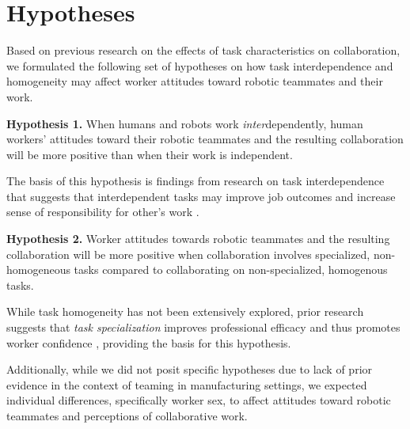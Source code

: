 \section{Hypotheses}
Based on previous research on the effects of task characteristics on collaboration, we formulated the following set of hypotheses on how task interdependence and homogeneity may affect worker attitudes toward robotic teammates and their work.

\textbf{Hypothesis 1.} When humans and robots work \textit{inter}dependently, human workers' attitudes toward their robotic teammates and the resulting collaboration will be more positive than when their work is independent.

The basis of this hypothesis is findings from research on task interdependence that suggests that interdependent tasks may improve job outcomes and increase sense of responsibility for other's work \cite{van1998motivating, johnson2012autonomy}.

\textbf{Hypothesis 2.} Worker attitudes towards robotic teammates and the resulting collaboration will be more positive when collaboration involves specialized, non-homogeneous tasks compared to collaborating on non-specialized, homogenous tasks.

While task homogeneity has not been extensively explored, prior research suggests that \textit{task specialization} improves professional efficacy and thus promotes worker confidence \cite{hsieh2004reassessment}, providing the basis for this hypothesis. 

Additionally, while we did not posit specific hypotheses due to lack of prior evidence in the context of teaming in manufacturing settings, we expected individual differences, specifically worker sex, to affect attitudes toward robotic teammates and perceptions of collaborative work.
